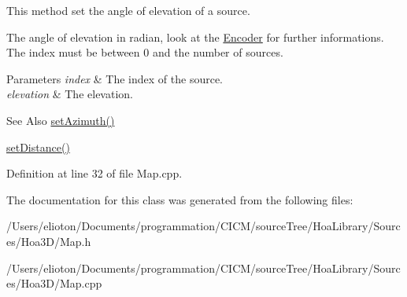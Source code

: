 This method set the angle of elevation of a source. 

The angle of elevation in radian, look at the \hyperlink{class_hoa3_d_1_1_encoder}{Encoder} for further informations. The index must be between 0 and the number of sources.


\begin{DoxyParams}{Parameters}
{\em index} & The index of the source. \\
\hline
{\em elevation} & The elevation. \\
\hline
\end{DoxyParams}
\begin{DoxySeeAlso}{See Also}
\hyperlink{class_hoa3_d_1_1_map_a251f215d1e137e652d12fc8e811bd8c8}{set\-Azimuth()} 

\hyperlink{class_hoa3_d_1_1_map_a61b55ea17301701fc02dffca46957330}{set\-Distance()} 
\end{DoxySeeAlso}


Definition at line 32 of file Map.\-cpp.



The documentation for this class was generated from the following files\-:\begin{DoxyCompactItemize}
\item 
/\-Users/elioton/\-Documents/programmation/\-C\-I\-C\-M/source\-Tree/\-Hoa\-Library/\-Sources/\-Hoa3\-D/Map.\-h\item 
/\-Users/elioton/\-Documents/programmation/\-C\-I\-C\-M/source\-Tree/\-Hoa\-Library/\-Sources/\-Hoa3\-D/Map.\-cpp\end{DoxyCompactItemize}
